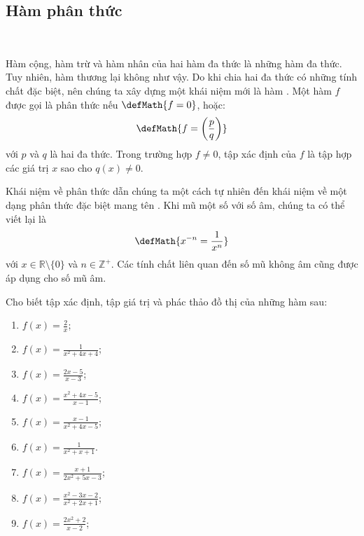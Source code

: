 \subsection{Hàm phân thức}

\ %

Hàm cộng, hàm trừ và hàm nhân của hai hàm đa thức là những hàm đa thức. Tuy nhiên, hàm thương lại không như vậy. Do khi chia hai đa thức có những tính chất đặc biệt, nên chúng ta xây dựng một khái niệm mới là hàm . Một hàm $f$ được gọi là phân thức nếu $\defMath{f = 0}$, hoặc: $$\defMath{f = \left(\frac{p}{q}\right)}$$ với $p$ và $q$ là hai đa thức. Trong trường hợp $f \neq 0$, tập xác định của $f$ là tập hợp các giá trị $x$ sao cho $q(x) \neq 0$. 

Khái niệm về phân thức dẫn chúng ta một cách tự nhiên đến khái niệm về một dạng phân thức đặc biệt mang tên . Khi mũ một số với số âm, chúng ta có thể viết lại là $$\defMath{x^{-n} = \frac{1}{x^n}}$$ với $x \in \mathbb{R} \setminus \{0\}$ và $n \in \mathbb{Z}^+$. Các tính chất liên quan đến số mũ không âm cũng được áp dụng cho số mũ âm.

\exercise Cho biết tập xác định, tập giá trị và phác thảo đồ thị của những hàm sau:
\begin{multicols}{3}
   \begin{enumerate}
      \item $\displaystyle f(x) = \frac{2}{x}$;
      \item $\displaystyle f(x) = \frac{1}{x^2 + 4x + 4}$;
      \item $\displaystyle f(x) = \frac{2x - 5}{x - 3}$;
      \item $\displaystyle f(x) = \frac{x^2 + 4x - 5}{x - 1}$;
      \item $\displaystyle f(x) = \frac{x - 1}{x^2 + 4x - 5}$;
      \item $\displaystyle f(x) = \frac{1}{x^2 + x + 1}$.
      \item $\displaystyle f(x) = \frac{x + 1}{2x^2 + 5x - 3}$;
      \item $\displaystyle f(x) = \frac{x^2 - 3x - 2}{x^2 + 2x + 1}$;
      \item $\displaystyle f(x) = \frac{2x^2 + 2}{x - 2}$;
   \end{enumerate}
\end{multicols}

\solution

